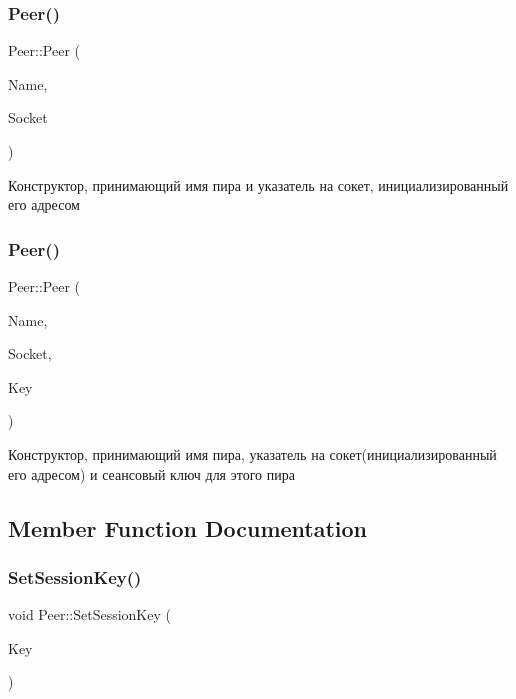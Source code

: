 \subsubsection{Peer()\hspace{0.1cm}{\footnotesize\ttfamily [2/3]}}
{\footnotesize\ttfamily Peer\+::\+Peer (\begin{DoxyParamCaption}\item[{Q\+String}]{Name,  }\item[{std\+::shared\+\_\+ptr$<$ Q\+Tcp\+Socket $>$}]{Socket }\end{DoxyParamCaption})}



Конструктор, принимающий имя пира и указатель на сокет, инициализированный его адресом 

\mbox{\label{class_peer_aa72ba8fe59c6d161a87e398b40dd7f61}} 
\subsubsection{Peer()\hspace{0.1cm}{\footnotesize\ttfamily [3/3]}}
{\footnotesize\ttfamily Peer\+::\+Peer (\begin{DoxyParamCaption}\item[{Q\+String}]{Name,  }\item[{std\+::shared\+\_\+ptr$<$ Q\+Tcp\+Socket $>$}]{Socket,  }\item[{Q\+String}]{Key }\end{DoxyParamCaption})}



Конструктор, принимающий имя пира, указатель на сокет(инициализированный его адресом) и сеансовый ключ для этого пира 



\subsection{Member Function Documentation}
\mbox{\label{class_peer_a761fedbe29868c9c3fb3b2c0f337b18b}} 
\subsubsection{Set\+Session\+Key()}
{\footnotesize\ttfamily void Peer\+::\+Set\+Session\+Key (\begin{DoxyParamCaption}\item[{Q\+String}]{Key }\end{DoxyParamCaption})}



